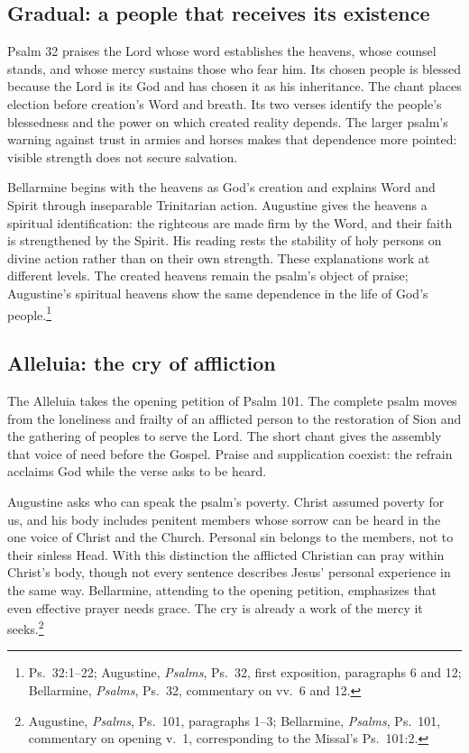 \subsection{Gradual: a people that receives its existence}
Psalm 32 praises the Lord whose word establishes the heavens, whose counsel stands, and whose mercy sustains those who fear him. Its chosen people is blessed because the Lord is its God and has chosen it as his inheritance. The chant places election before creation's Word and breath. Its two verses identify the people's blessedness and the power on which created reality depends. The larger psalm's warning against trust in armies and horses makes that dependence more pointed: visible strength does not secure salvation.

Bellarmine begins with the heavens as God's creation and explains Word and Spirit through inseparable Trinitarian action. Augustine gives the heavens a spiritual identification: the righteous are made firm by the Word, and their faith is strengthened by the Spirit. His reading rests the stability of holy persons on divine action rather than on their own strength. These explanations work at different levels. The created heavens remain the psalm's object of praise; Augustine's spiritual heavens show the same dependence in the life of God's people.\footnote{Ps.~32:1--22; Augustine, \textit{Psalms}, Ps.~32, first exposition, paragraphs 6 and 12; Bellarmine, \textit{Psalms}, Ps.~32, commentary on vv.~6 and 12.}

\subsection{Alleluia: the cry of affliction}
The Alleluia takes the opening petition of Psalm 101. The complete psalm moves from the loneliness and frailty of an afflicted person to the restoration of Sion and the gathering of peoples to serve the Lord. The short chant gives the assembly that voice of need before the Gospel. Praise and supplication coexist: the refrain acclaims God while the verse asks to be heard.

Augustine asks who can speak the psalm's poverty. Christ assumed poverty for us, and his body includes penitent members whose sorrow can be heard in the one voice of Christ and the Church. Personal sin belongs to the members, not to their sinless Head. With this distinction the afflicted Christian can pray within Christ's body, though not every sentence describes Jesus' personal experience in the same way. Bellarmine, attending to the opening petition, emphasizes that even effective prayer needs grace. The cry is already a work of the mercy it seeks.\footnote{Augustine, \textit{Psalms}, Ps.~101, paragraphs 1--3; Bellarmine, \textit{Psalms}, Ps.~101, commentary on opening v.~1, corresponding to the Missal's Ps.~101:2.}

